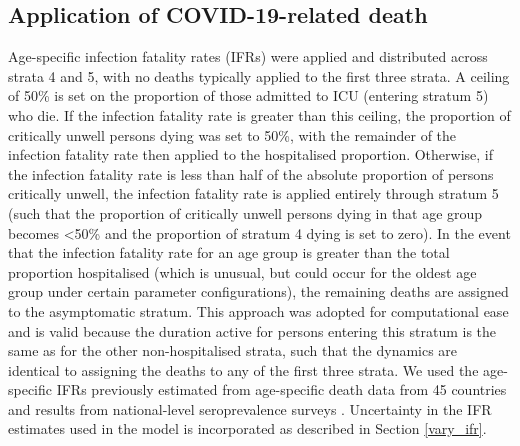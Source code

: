 \subsection{Application of COVID-19-related death}
Age-specific infection fatality rates (IFRs) were applied and distributed across strata 4 and 5, with no deaths typically applied to the first three strata. A ceiling of 50\% is set on the proportion of those admitted to ICU (entering stratum 5) who die. If the infection fatality rate is greater than this ceiling, the proportion of critically unwell persons dying was set to 50\%, with the remainder of the infection fatality rate then applied to the hospitalised proportion. Otherwise, if the infection fatality rate is less than half of the absolute proportion of persons critically unwell, the infection fatality rate is applied entirely through stratum 5 (such that the proportion of critically unwell persons dying in that age group becomes \textless 50\% and the proportion of stratum 4 dying is set to zero). In the event that the infection fatality rate for an age group is greater than the total proportion hospitalised (which is unusual, but could occur for the oldest age group under certain parameter configurations), the remaining deaths are assigned to the asymptomatic stratum. This approach was adopted for computational ease and is valid because the duration active for persons entering this stratum is the same as for the other non-hospitalised strata, such that the dynamics are identical to assigning the deaths to any of the first three strata. We used the age-specific IFRs previously estimated from age-specific death data from 45 countries and results from national-level seroprevalence surveys \cite{RN6}. Uncertainty in the IFR estimates used in the model is incorporated as described in Section \ref{vary_ifr}.

